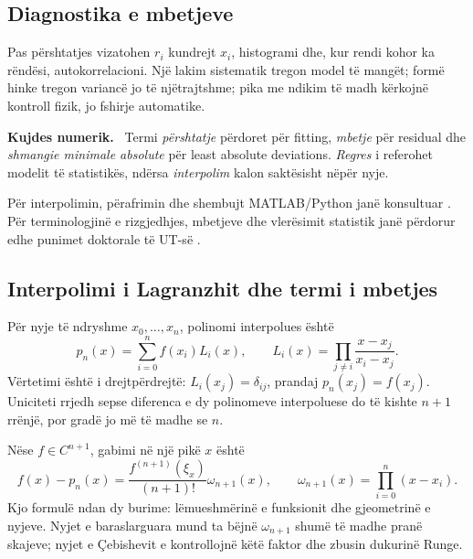 \documentclass[11pt,oneside,openany]{book}
\newenvironment{kujdes}{\par\medskip\noindent\textbf{Kujdes numerik.}\ }{\par\medskip}
\begin{document}
\subsection{Diagnostika e mbetjeve}
Pas përshtatjes vizatohen $r_i$ kundrejt $x_i$, histogrami dhe, kur rendi kohor ka rëndësi, autokorrelacioni. Një lakim sistematik tregon model të mangët; formë hinke tregon variancë jo të njëtrajtshme; pika me ndikim të madh kërkojnë kontroll fizik, jo fshirje automatike.

\begin{kujdes}
Termi \emph{përshtatje} përdoret për fitting, \emph{mbetje} për residual dhe \emph{shmangie minimale absolute} për least absolute deviations. \emph{Regres} i referohet modelit të statistikës, ndërsa \emph{interpolim} kalon saktësisht nëpër nyje.
\end{kujdes}

Për interpolimin, përafrimin dhe shembujt MATLAB/Python janë konsultuar \cite{hanelli,hoxha,datja}. Për terminologjinë e rizgjedhjes, mbetjeve dhe vlerësimit statistik janë përdorur edhe punimet doktorale të UT-së \cite{butka,tasho}.



\subsection{Interpolimi i Lagranzhit dhe termi i mbetjes}
Për nyje të ndryshme $x_0,\ldots,x_n$, polinomi interpolues është
\begin{equation}
 p_n(x)=\sum_{i=0}^{n}f(x_i)L_i(x),\qquad
 L_i(x)=\prod_{j\ne i}\frac{x-x_j}{x_i-x_j}.
\end{equation}
Vërtetimi është i drejtpërdrejtë: $L_i(x_j)=\delta_{ij}$, prandaj $p_n(x_j)=f(x_j)$. Uniciteti rrjedh sepse diferenca e dy polinomeve interpoluese do të kishte $n+1$ rrënjë, por gradë jo më të madhe se $n$.

Nëse $f\in C^{n+1}$, gabimi në një pikë $x$ është
\begin{equation}
 f(x)-p_n(x)=\frac{f^{(n+1)}(\xi_x)}{(n+1)!}
 \omega_{n+1}(x),\qquad
 \omega_{n+1}(x)=\prod_{i=0}^{n}(x-x_i).
\end{equation}
Kjo formulë ndan dy burime: lëmueshmërinë e funksionit dhe gjeometrinë e nyjeve. Nyjet e baraslarguara mund ta bëjnë $\omega_{n+1}$ shumë të madhe pranë skajeve; nyjet e Çebishevit e kontrollojnë këtë faktor dhe zbusin dukurinë Runge.
\end{document}
